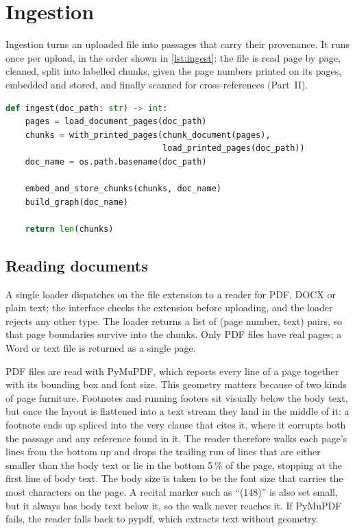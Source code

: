 \section{Ingestion}
\label{sec:ingestion}

Ingestion turns an uploaded file into passages that carry their provenance.
It runs once per upload, in the order shown in \cref{lst:ingest}: the file is
read page by page, cleaned, split into labelled chunks, given the page numbers
printed on its pages, embedded and stored, and finally scanned for
cross-references (Part~II).

\begin{lstlisting}[float, language=Python, caption={The ingestion entry point
(\texttt{pipeline/pipeline.py}).}, label={lst:ingest}]
def ingest(doc_path: str) -> int:
    pages = load_document_pages(doc_path)
    chunks = with_printed_pages(chunk_document(pages),
                                load_printed_pages(doc_path))
    doc_name = os.path.basename(doc_path)

    embed_and_store_chunks(chunks, doc_name)
    build_graph(doc_name)

    return len(chunks)
\end{lstlisting}

\subsection{Reading documents}

A single loader dispatches on the file extension to a reader for PDF, DOCX or
plain text; the interface checks the extension before uploading, and the loader
rejects any other type. The loader returns a list of (page number, text) pairs,
so that page boundaries survive into the chunks. Only PDF files have real pages;
a Word or text file is returned as a single page.

PDF files are read with PyMuPDF, which reports every line of a page together
with its bounding box and font size. This geometry matters because of two kinds
of page furniture. Footnotes and running footers sit visually below the body
text, but once the layout is flattened into a text stream they land in the
middle of it: a footnote ends up spliced into the very clause that cites it,
where it corrupts both the passage and any reference found in it. The reader
therefore walks each page's lines from the bottom up and drops the trailing run
of lines that are either smaller than the body text or lie in the bottom 5\,\%
of the page, stopping at the first line of body text. The body size is taken to
be the font size that carries the most characters on the page. A recital marker
such as ``(148)'' is also set small, but it always has body text below it, so
the walk never reaches it. If PyMuPDF fails, the reader falls back to pypdf,
which extracts text without geometry.

